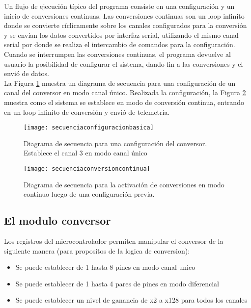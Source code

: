 Un flujo de ejecución típico del programa consiste en una configuración y un inicio de conversiones continuas. Las conversiones continuas son un loop infinito donde se convierte cíclicamente sobre los canales configurados para la conversión y se envían los datos convertidos por interfaz serial, utilizando el mismo canal serial por donde se realiza el intercambio de comandos para la configuración. Cuando se interrumpen las conversiones continuas, el programa devuelve al usuario la posibilidad de configurar el sistema, dando fin a las conversiones y el envió de datos. \\

La Figura \ref{fig:secuenciaconfiguracionbasica} muestra un diagrama de secuencia para una configuración de un canal del conversor en modo canal único. Realizada la configuración, la Figura \ref{fig:secuenciaconversioncontinua} muestra como el sistema se establece en modo de conversión continua, entrando en un loop infinito de conversión y envió de telemetría.

\begin{figure}[h]
  \centering
  \texttt{[image: secuenciaconfiguracionbasica]}
  \caption{Diagrama de secuencia para una configuración del conversor. Establece el canal 3 en modo canal único}\label{fig:secuenciaconfiguracionbasica}
\end{figure}

\begin{figure}[h]
  \centering
  \texttt{[image: secuenciaconversioncontinua]}
  \caption{Diagrama de secuencia para la activación de conversiones en modo continuo luego de una configuración previa.}\label{fig:secuenciaconversioncontinua}
\end{figure}



\subsection{El modulo conversor} %
\label{it2:sub:el_modulo_conversor}

Los registros del microcontrolador permiten manipular el conversor de la siguiente manera (para propositos de la logica de conversion):

\begin{itemize}
  \item Se puede establecer de 1 hasta 8 pines en modo canal unico
  \item Se puede establecer de 1 hasta 4 pares de pines en modo diferencial
  \item Se puede establecer un nivel de ganancia de x2 a x128 para todos los canales
\end{itemize}

